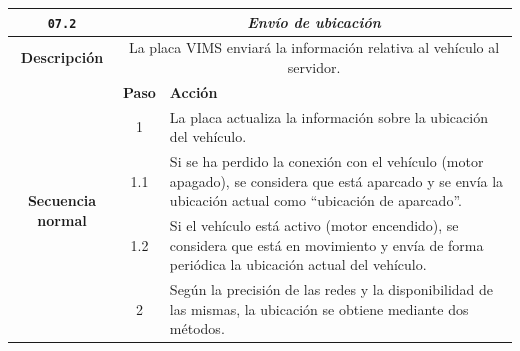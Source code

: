 \begin{table}[H]
  \centering
  \begin{tabularx}{\textwidth}{|c|c|X|}
    \hline
    \texttt{07.2}                               & \multicolumn{2}{c|}{\textit{Envío de ubicación}}                                                                                                                                                                                                                                                 \\
    \hline
    \textbf{Descripción}                        & \multicolumn{2}{X|}{La placa \ac{VIMS} enviará la información relativa al vehículo al servidor.}                                                                                                                                                                                                 \\
    \hline
    \multirow{18}{*}{\textbf{Secuencia normal}} & \textbf{Paso}                                                                                    & \textbf{Acción}                                                                                                                                                                               \\
    \cline{2-3}
                                                & 1                                                                                                & \multicolumn{1}{L|}{La placa actualiza la información sobre la ubicación del vehículo.}                                                                                                       \\
    \cline{2-3}
                                                & 1.1                                                                                              & \multicolumn{1}{L|}{Si se ha perdido la conexión con el vehículo (motor apagado), se considera que está aparcado y se envía la ubicación actual como ``ubicación de aparcado''.}              \\
    \cline{2-3}
                                                & 1.2                                                                                              & \multicolumn{1}{L|}{Si el vehículo está activo (motor encendido), se considera que está en movimiento y envía de forma periódica la ubicación actual del vehículo.}                           \\
    \cline{2-3}
                                                & 2                                                                                                & \multicolumn{1}{L|}{Según la precisión de las redes y la disponibilidad de las mismas, la ubicación se obtiene mediante dos métodos.}                                                         \\

\end{tabularx}
\end{table}
